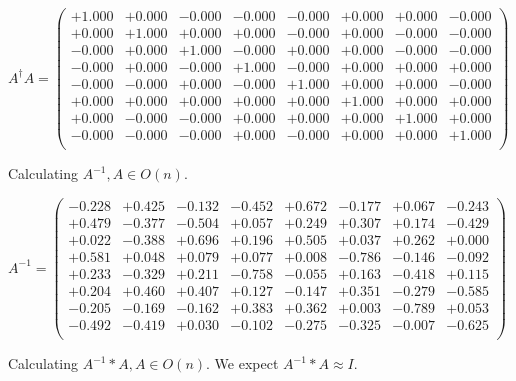 \documentclass[9pt]{article}
\theoremstyle{plain}
\theoremstyle{definition}
\theoremstyle{remark}
\numberwithin{equation}{section}
\begin{document}
$A^{\dag} A = \left(
\begin{array}{
cccccccc}
+1.000 & +0.000 & -0.000 & -0.000 & -0.000 & +0.000 & +0.000 & -0.000 \\
+0.000 & +1.000 & +0.000 & +0.000 & -0.000 & +0.000 & -0.000 & -0.000 \\
-0.000 & +0.000 & +1.000 & -0.000 & +0.000 & +0.000 & -0.000 & -0.000 \\
-0.000 & +0.000 & -0.000 & +1.000 & -0.000 & +0.000 & +0.000 & +0.000 \\
-0.000 & -0.000 & +0.000 & -0.000 & +1.000 & +0.000 & +0.000 & -0.000 \\
+0.000 & +0.000 & +0.000 & +0.000 & +0.000 & +1.000 & +0.000 & +0.000 \\
+0.000 & -0.000 & -0.000 & +0.000 & +0.000 & +0.000 & +1.000 & +0.000 \\
-0.000 & -0.000 & -0.000 & +0.000 & -0.000 & +0.000 & +0.000 & +1.000 \\
\end{array}
\right)$ \newline 

Calculating $A^{-1} ,  A \in O(n)$.

$A^{-1} = \left(
\begin{array}{
cccccccc}
-0.228 & +0.425 & -0.132 & -0.452 & +0.672 & -0.177 & +0.067 & -0.243 \\
+0.479 & -0.377 & -0.504 & +0.057 & +0.249 & +0.307 & +0.174 & -0.429 \\
+0.022 & -0.388 & +0.696 & +0.196 & +0.505 & +0.037 & +0.262 & +0.000 \\
+0.581 & +0.048 & +0.079 & +0.077 & +0.008 & -0.786 & -0.146 & -0.092 \\
+0.233 & -0.329 & +0.211 & -0.758 & -0.055 & +0.163 & -0.418 & +0.115 \\
+0.204 & +0.460 & +0.407 & +0.127 & -0.147 & +0.351 & -0.279 & -0.585 \\
-0.205 & -0.169 & -0.162 & +0.383 & +0.362 & +0.003 & -0.789 & +0.053 \\
-0.492 & -0.419 & +0.030 & -0.102 & -0.275 & -0.325 & -0.007 & -0.625 \\
\end{array}
\right)$ \newline 

Calculating $A^{-1} *A  ,  A \in O(n)$.   We expect $A^{-1} *A  \approx I$. 
\end{document}

